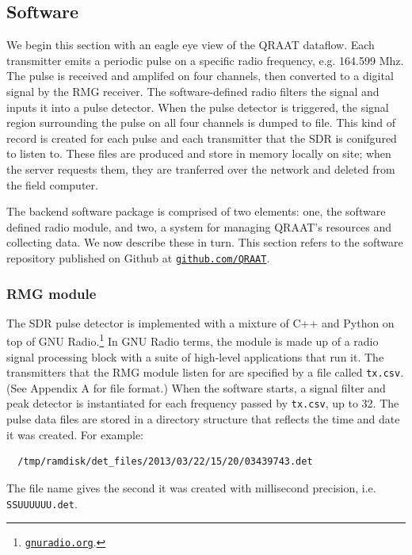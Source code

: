 \documentclass[letter]{article}
\newcounter{foot}
\begin{document}
\subsection{Software}
We begin this section with an eagle eye view of the QRAAT dataflow. Each transmitter emits 
a periodic pulse on a specific radio frequency, e.g. 164.599 Mhz. The pulse is received and
amplifed on four channels, then converted to a digital signal by the RMG receiver.
The software-defined radio filters the signal and inputs it into a pulse detector. When the 
pulse detector is triggered, the signal region surrounding the pulse on all four channels
is dumped to file. This kind of record is created for each pulse and each transmitter
that the SDR is conifgured to listen to. These files are produced and store in memory locally
on site; when the server requests them, they are tranferred over the network and deleted from
the field computer. 

The backend software package is comprised of two elements: one, the software defined radio 
module, and two, a system for managing QRAAT's resources and collecting data. We now describe 
these in turn. This section refers to the software repository published on Github at 
\href{http://github.com/QRAAT/QRAAT/}{\tt github.com/QRAAT}.

\subsubsection{RMG module}
The SDR pulse detector is implemented with a mixture of C++ and Python on top of 
GNU Radio.\footnote{\href{http://gnuradio.org/redmine/}{\tt gnuradio.org}.} 
In GNU Radio terms, the module is made up of a radio signal processing block with a suite 
of high-level applications that run it. The transmitters that the RMG module listen for
are specified by a file called \texttt{tx.csv}. (See Appendix A for file format.) When 
the software starts, a signal filter and peak detector is instantiated for each 
frequency passed by \texttt{tx.csv}, up to 32. The pulse data files are stored in a 
directory structure that reflects the time and date it was created. For example: 
\begin{verbatim}
  /tmp/ramdisk/det_files/2013/03/22/15/20/03439743.det
\end{verbatim}
The file name gives the second it was created with millisecond precision, i.e. 
\texttt{SSUUUUUU.det}.
\end{document}
